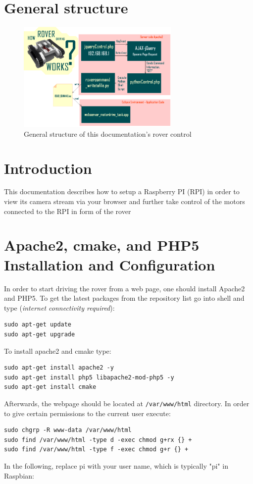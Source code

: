 \section{General structure}
\begin{figure}[h!]
\centering
\includegraphics[width=0.7\textwidth]{structure.png}
\caption{General structure of this documentation's rover control}
\label{fig:struct}
\end{figure}

\section{Introduction}
This documentation describes how to setup a Raspberry PI (RPI) in order to view its camera stream via your browser and further take control of the motors connected to the RPI in form of the rover %

\section{Apache2, cmake, and PHP5 Installation and Configuration}
	In order to start driving the rover from a web page, one should install Apache2 and PHP5. To get the latest packages from the repository list go into shell and type (\textit{internet connectivity required}):
\begin{lstlisting}
sudo apt-get update
sudo apt-get upgrade
\end{lstlisting}
To install apache2 and cmake type:
\begin{lstlisting}
sudo apt-get install apache2 -y
sudo apt-get install php5 libapache2-mod-php5 -y
sudo apt-get install cmake
\end{lstlisting}
Afterwards, the webpage should be located at \texttt{/var/www/html} directory. In order to give certain permissions to the current user execute: 
\begin{lstlisting}
sudo chgrp -R www-data /var/www/html
sudo find /var/www/html -type d -exec chmod g+rx {} +
sudo find /var/www/html -type f -exec chmod g+r {} +
\end{lstlisting}
In the following, replace pi with your user name, which is typically "pi" in Raspbian:

